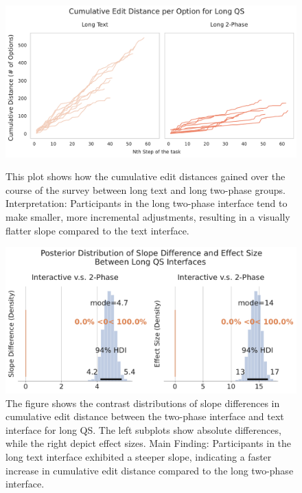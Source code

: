 \begin{figure}[h]
    \centering
    \begin{minipage}[t]{0.48\textwidth}
        \centering
        \includegraphics[width=\textwidth]{content/image/distance/cumulative_edit_distance_per_option_long_qs_v3v4.pdf}
        \caption{This plot shows how the cumulative edit distances gained over the course of the survey between long text and long two-phase groups. Interpretation: Participants in the long two-phase interface tend to make smaller, more incremental adjustments, resulting in a visually flatter slope compared to the text interface.}
        \label{fig:cumulative-distance}
    \end{minipage}
    \hfill
    \begin{minipage}[t]{0.48\textwidth}
        \centering
        \includegraphics[width=\textwidth]{content/image/distance/slope_diff_and_effect_size.pdf}
        \caption{The figure shows the contrast distributions of slope differences in cumulative edit distance between the two-phase interface and text interface for long QS. The left subplots show absolute differences, while the right depict effect sizes. Main Finding: Participants in the long text interface exhibited a steeper slope, indicating a faster increase in cumulative edit distance compared to the long two-phase interface.}
        \label{fig:slope-diff-effect}
    \end{minipage}
\end{figure}

